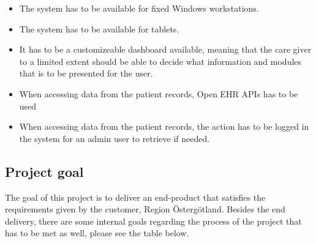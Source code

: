 \begin{itemize}
    \item The system has to be available for fixed Windows workstations.
    \item The system has to be available for tablets. 
    \item It has to be a customizeable dashboard available, meaning that the care giver to a limited extent should be able to decide what information and modules that is to be presented for the user.  
    \item When accessing data from the patient records, Open EHR APIs has to be used
    \item When accessing data from the patient records, the action has to be logged in the system for an admin user to retrieve if needed.
\end{itemize}

\subsection{Project goal}
The goal of this project is to deliver an end-product that satisfies the requirements given by the customer, Region Östergötland. Besides the end delivery, there are some internal goals regarding the process of the project that has to be met as well, please see the table below.

